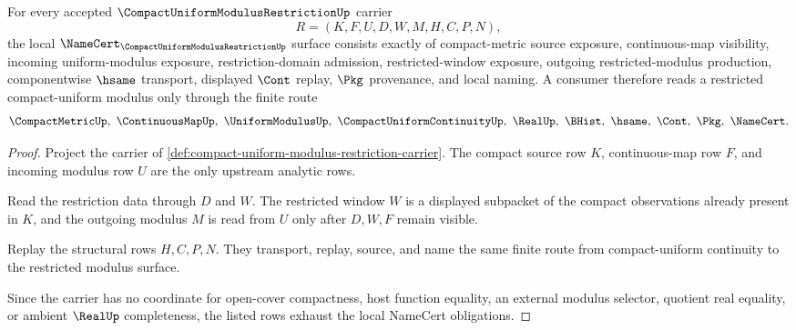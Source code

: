 \begin{theorem}
\label{thm:compact-uniform-modulus-restriction-namecert-obligations}
For every accepted $\CompactUniformModulusRestrictionUp$ carrier
$$
R=(K,F,U,D,W,M,H,C,P,N),
$$
the local $\NameCert_{\CompactUniformModulusRestrictionUp}$ surface consists exactly of compact-metric source exposure, continuous-map visibility, incoming uniform-modulus exposure, restriction-domain admission, restricted-window exposure, outgoing restricted-modulus production, componentwise $\hsame$ transport, displayed $\Cont$ replay, $\Pkg$ provenance, and local naming. A consumer therefore reads a restricted compact-uniform modulus only through the finite route
$$
\CompactMetricUp,\ \ContinuousMapUp,\ \UniformModulusUp,\ \CompactUniformContinuityUp,\ \RealUp,\ \BHist,\ \hsame,\ \Cont,\ \Pkg,\ \NameCert .
$$
\end{theorem}
\begin{proof}
Project the carrier of \autoref{def:compact-uniform-modulus-restriction-carrier}. The compact source row $K$, continuous-map row $F$, and incoming modulus row $U$ are the only upstream analytic rows.

Read the restriction data through $D$ and $W$. The restricted window $W$ is a displayed subpacket of the compact observations already present in $K$, and the outgoing modulus $M$ is read from $U$ only after $D,W,F$ remain visible.

Replay the structural rows $H,C,P,N$. They transport, replay, source, and name the same finite route from compact-uniform continuity to the restricted modulus surface.

Since the carrier has no coordinate for open-cover compactness, host function equality, an external modulus selector, quotient real equality, or ambient $\RealUp$ completeness, the listed rows exhaust the local NameCert obligations.
\end{proof}



